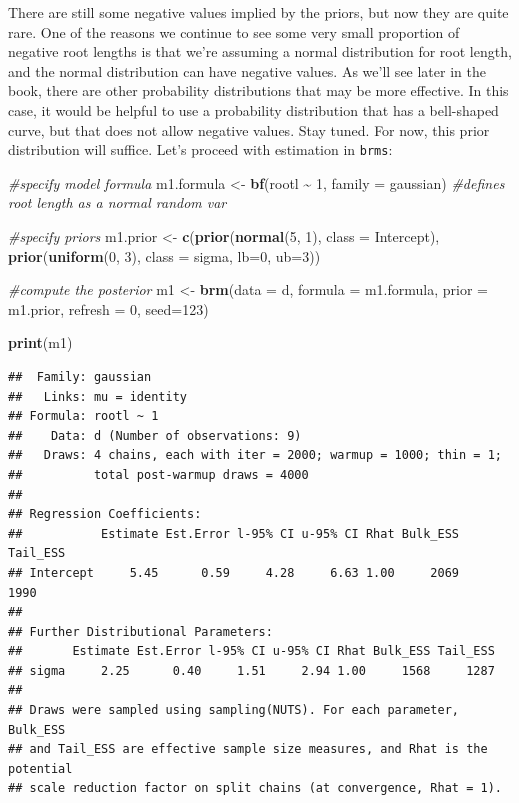 \documentclass[
]{book}
\newenvironment{Shaded}{\begin{snugshade}}{\end{snugshade}}
\newcommand{\AttributeTok}[1]{\textcolor[rgb]{0.13,0.29,0.53}{#1}}
\newcommand{\CommentTok}[1]{\textcolor[rgb]{0.56,0.35,0.01}{\textit{#1}}}
\newcommand{\DecValTok}[1]{\textcolor[rgb]{0.00,0.00,0.81}{#1}}
\newcommand{\FunctionTok}[1]{\textcolor[rgb]{0.13,0.29,0.53}{\textbf{#1}}}
\newcommand{\NormalTok}[1]{#1}
\newcommand{\OtherTok}[1]{\textcolor[rgb]{0.56,0.35,0.01}{#1}}
\newcommand{\SpecialCharTok}[1]{\textcolor[rgb]{0.81,0.36,0.00}{\textbf{#1}}}
\begin{document}
There are still some negative values implied by the priors, but now they are quite rare. One of the reasons we continue to see some very small proportion of negative root lengths is that we're assuming a normal distribution for root length, and the normal distribution can have negative values. As we'll see later in the book, there are other probability distributions that may be more effective. In this case, it would be helpful to use a probability distribution that has a bell-shaped curve, but that does not allow negative values. Stay tuned. For now, this prior distribution will suffice. Let's proceed with estimation in \texttt{brms}:

\begin{Shaded}
\begin{Highlighting}[]
\CommentTok{\#specify model formula}
\NormalTok{m1.formula }\OtherTok{\textless{}{-}} \FunctionTok{bf}\NormalTok{(rootl }\SpecialCharTok{\textasciitilde{}} \DecValTok{1}\NormalTok{,}
                \AttributeTok{family =}\NormalTok{ gaussian) }\CommentTok{\#defines root length as a normal random var}

\CommentTok{\#specify priors}
\NormalTok{m1.prior }\OtherTok{\textless{}{-}} \FunctionTok{c}\NormalTok{(}\FunctionTok{prior}\NormalTok{(}\FunctionTok{normal}\NormalTok{(}\DecValTok{5}\NormalTok{, }\DecValTok{1}\NormalTok{), }\AttributeTok{class =}\NormalTok{ Intercept),}
             \FunctionTok{prior}\NormalTok{(}\FunctionTok{uniform}\NormalTok{(}\DecValTok{0}\NormalTok{, }\DecValTok{3}\NormalTok{), }\AttributeTok{class =}\NormalTok{ sigma, }\AttributeTok{lb=}\DecValTok{0}\NormalTok{, }\AttributeTok{ub=}\DecValTok{3}\NormalTok{))}
              
\CommentTok{\#compute the posterior}
\NormalTok{m1 }\OtherTok{\textless{}{-}} \FunctionTok{brm}\NormalTok{(}\AttributeTok{data =}\NormalTok{ d,}
         \AttributeTok{formula =}\NormalTok{ m1.formula,}
         \AttributeTok{prior =}\NormalTok{ m1.prior,}
         \AttributeTok{refresh =} \DecValTok{0}\NormalTok{,}
         \AttributeTok{seed=}\DecValTok{123}\NormalTok{)}

\FunctionTok{print}\NormalTok{(m1)}
\end{Highlighting}
\end{Shaded}

\begin{verbatim}
##  Family: gaussian 
##   Links: mu = identity 
## Formula: rootl ~ 1 
##    Data: d (Number of observations: 9) 
##   Draws: 4 chains, each with iter = 2000; warmup = 1000; thin = 1;
##          total post-warmup draws = 4000
## 
## Regression Coefficients:
##           Estimate Est.Error l-95% CI u-95% CI Rhat Bulk_ESS Tail_ESS
## Intercept     5.45      0.59     4.28     6.63 1.00     2069     1990
## 
## Further Distributional Parameters:
##       Estimate Est.Error l-95% CI u-95% CI Rhat Bulk_ESS Tail_ESS
## sigma     2.25      0.40     1.51     2.94 1.00     1568     1287
## 
## Draws were sampled using sampling(NUTS). For each parameter, Bulk_ESS
## and Tail_ESS are effective sample size measures, and Rhat is the potential
## scale reduction factor on split chains (at convergence, Rhat = 1).
\end{verbatim}
\end{document}
